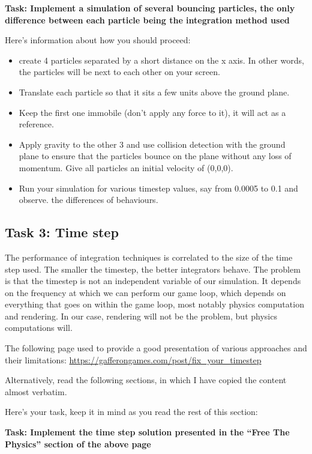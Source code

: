 \documentclass[12pt]{article}
\begin{document}
\textbf{Task: Implement a simulation of several bouncing particles, the only difference between each particle being the integration method used}

Here's information about how you should proceed:

\begin{itemize}
\item create 4 particles separated by a short distance on the x axis. In other words, the particles will be next to each other on your screen.
\item Translate each particle so that it sits a few units above the ground plane.
\item Keep the first one immobile (don't apply any force to it), it will act as a reference.
\item Apply gravity to the other 3 and use collision detection with the ground plane to ensure that the particles bounce on the plane without any loss of momentum. Give all particles an initial velocity of (0,0,0).
\item Run your simulation for various timestep values, say from 0.0005 to 0.1 and observe.
the differences of behaviours.
\end{itemize}

\subsection*{Task 3: Time step}

The performance of integration techniques is correlated to the size of the time step used. The smaller the timestep, the better integrators behave. The problem is that the timestep is not an independent variable of our simulation. It depends on the frequency at which we can perform our game loop, which depends on everything that goes on within the game loop, most notably physics computation and rendering. In our case, rendering will not be the problem, but physics computations will. 

The following page used to provide a good presentation of various approaches and their limitations: \url{https://gafferongames.com/post/fix_your_timestep}

Alternatively, read the following sections, in which I have copied the content almost verbatim.

Here's your task, keep it in mind as you read the rest of this section:

\textbf{Task: Implement the time step solution presented in the ``Free The Physics'' section of the above page}
\end{document}
